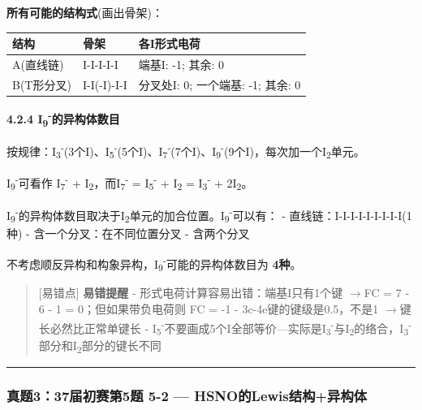 \documentclass[a4paper,11pt]{ctexart}
\newcounter{none}
\newcommand{\箭}{\ensuremath{\rightarrow}}
\newcommand{\左箭}{\ensuremath{\leftarrow}}
\newcommand{\上箭}{\ensuremath{\uparrow}}
\newcommand{\下箭}{\ensuremath{\downarrow}}
\newcommand{\衡}{\ensuremath{\rightleftharpoons}}
\newcommand{\双箭}{\ensuremath{\leftrightarrow}}
\newcommand{\约等于}{\ensuremath{\approx}}
\newcommand{\小于等于}{\ensuremath{\leq}}
\newcommand{\大于等于}{\ensuremath{\geq}}
\newcommand{\不等于}{\ensuremath{\neq}}
\newcommand{\西格马}{\ensuremath{\sigma}}
\newcommand{\派}{\ensuremath{\pi}}
\begin{document}
\textbf{所有可能的结构式}(画出骨架)：

{\def\LTcaptype{none} %
\begin{longtable}[]{@{}lll@{}}
\toprule\noalign{}
结构 & 骨架 & 各I形式电荷 \\
\midrule\noalign{}
\endhead
\bottomrule\noalign{}
\endlastfoot
A(直线链) & I-I-I-I-I & 端基I: -1; 其余: 0 \\
B(T形分叉) & I-I(-I)-I-I & 分叉处I: 0; 一个端基: -1; 其余: 0 \\
\end{longtable}
}

\textbf{4.2.4 I\textsubscript{9}\textsuperscript{-}的异构体数目}

按规律：I\textsubscript{3}\textsuperscript{-}(3个I)、I\textsubscript{5}\textsuperscript{-}(5个I)、I\textsubscript{7}\textsuperscript{-}(7个I)、I\textsubscript{9}\textsuperscript{-}(9个I)，每次加一个I\textsubscript{2}单元。

I\textsubscript{9}\textsuperscript{-}可看作 I\textsubscript{7}\textsuperscript{-} + I\textsubscript{2}，而I\textsubscript{7}\textsuperscript{-} = I\textsubscript{5}\textsuperscript{-} + I\textsubscript{2} = I\textsubscript{3}\textsuperscript{-} + 2I\textsubscript{2}。

I\textsubscript{9}\textsuperscript{-}的异构体数目取决于I\textsubscript{2}单元的加合位置。I\textsubscript{9}\textsuperscript{-}可以有：
- 直线链：I-I-I-I-I-I-I-I-I(1种)
- 含一个分叉：在不同位置分叉
- 含两个分叉

不考虑顺反异构和构象异构，I\textsubscript{9}\textsuperscript{-}可能的异构体数目为 \textbf{4种}。

\begin{quote}
{[}易错点{]} \textbf{易错提醒}
- 形式电荷计算容易出错：端基I只有1个键 \箭 FC = 7 - 6 - 1 = 0；但如果带负电荷则 FC = -1
- 3c-4e键的键级是0.5，不是1 \箭 键长必然比正常单键长
- I\textsubscript{5}\textsuperscript{-}不要画成5个I全部等价---实际是I\textsubscript{3}\textsuperscript{-}与I\textsubscript{2}的络合，I\textsubscript{3}\textsuperscript{-}部分和I\textsubscript{2}部分的键长不同
\end{quote}

\begin{center}\rule{0.5\linewidth}{0.5pt}\end{center}

\subsubsection{真题3：37届初赛第5题 5-2 --- HSNO的Lewis结构+异构体}\label{ux771fux9898337ux5c4aux521dux8d5bux7b2c5ux9898-5-2-hsnoux7684lewisux7ed3ux6784ux5f02ux6784ux4f53}
\end{document}
